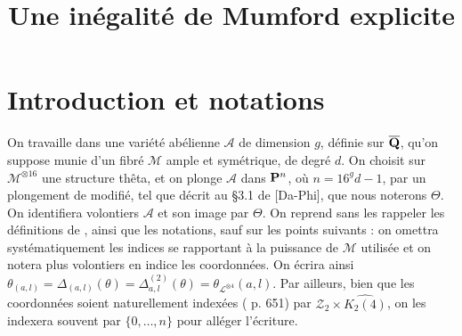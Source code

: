 

\newtheorem{thm}{Théorème}
\newtheorem{prop}[thm]{Proposition}
\newtheorem{lem}[thm]{Lemme}
\newtheorem{coro}[thm]{Corollaire}

\newcommand{\av}[2][v]{\left\lvert#2\right\rvert_{#1}}
\newcommand{\nv}[2][v]{\left\lVert#2\right\rVert_{#1}}
\newcommand{\nnv}[2][v]{%
  \left\lvert\hspace{-1pt}%
  \left\lvert\hspace{-1pt}%
  \left\lvert#2\right\rvert%
  \hspace{-1pt}\right\rvert%
  \hspace{-1pt}\right\rvert_{#1}}
\newcommand{\nvp}[2][v]{\|#2\|_{#1}}
\newcommand{\dv}{{\delta_v}}
\newcommand{\Dv}{\mathrm{dist}_v}
\newcommand{\A}{\mathcal{A}}
\newcommand{\p}[1]{{\boldsymbol{#1}}}
\newcommand{\OA}{\p{0}}
\newcommand{\coa}{\theta}
\newcommand{\BA}{\mathfrak{B}}
\newcommand{\hn}{\hat{h}}
\newcommand{\lgr}[1]{{|#1|}}
\newcommand{\vlg}[1]{\lgr #1}

\title{Une inégalité de Mumford explicite}



\maketitle

\section*{Introduction et notations}

On travaille dans une variété abélienne $\A$ de dimension $g$, définie sur
$\overline{\mathbf{Q}}$, qu'on suppose munie d'un fibré $\mathcal{M}$ ample et symétrique, de
degré $d$. On choisit sur $\mathcal{M}^{\otimes 16}$ une structure thêta, et
on plonge $\A$ dans $\mathbf{P}^n$, où $n=16^g d - 1$, par un plongement de
 modifié, tel que décrit au §3.1 de [Da-Phi], que nous noterons
$\Theta$. On identifiera volontiers $\A$ et son image par $\Theta$. On reprend
sans les rappeler les définitions de , ainsi que les notations,
sauf sur les points suivants : on omettra systématiquement les indices se
rapportant à la puissance de $\mathcal{M}$ utilisée et on notera plus
volontiers en indice les coordonnées. On écrira ainsi $\coa_{(a, l)} =
\Delta_{(a, l)}(\coa)  = \Delta_{a, l}^{(2)}(\coa) =
\coa_{\mathcal{L}^{\otimes 4}}(a, l)$. Par ailleurs, bien que les coordonnées
soient naturellement indexées ( p. 651) par $\mathcal{Z}_2 \times
\widehat{K_2(4)}$, on les indexera souvent par $\{0, \dots, n\}$ pour alléger
l'écriture.

